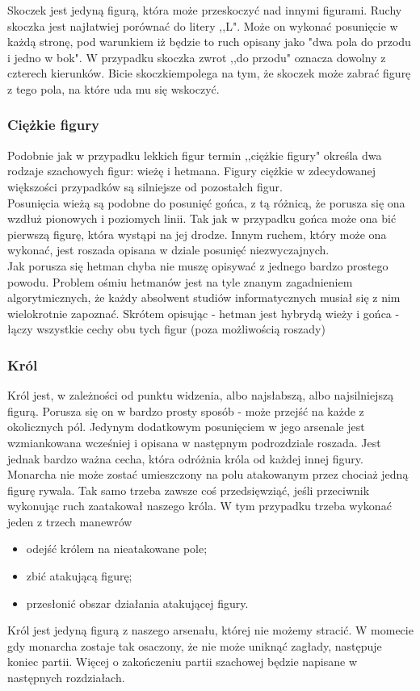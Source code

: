 \documentclass[12pt,leqno]{article}
\begin{document}
Skoczek jest jedyną figurą, która może przeskoczyć nad innymi figurami. Ruchy skoczka jest najłatwiej porównać do litery ,,L". Może on wykonać posunięcie w każdą stronę, pod warunkiem iż będzie to ruch opisany jako "dwa pola do przodu i jedno w bok". W przypadku skoczka zwrot ,,do przodu" oznacza dowolny z czterech kierunków. Bicie skoczkiempolega na tym, że skoczek może zabrać figurę z tego pola, na które uda mu się wskoczyć.
\subsubsection{Ciężkie figury}
Podobnie jak w przypadku lekkich figur termin ,,ciężkie figury" określa dwa rodzaje szachowych figur:  wieżę i hetmana. Figury ciężkie w zdecydowanej większości przypadków są silniejsze od pozostałch figur. \\
Posunięcia wieżą są podobne do posunięć gońca, z tą różnicą, że porusza się ona wzdłuż pionowych i poziomych linii. Tak jak w przypadku gońca może ona bić pierwszą figurę, która wystąpi na jej drodze. Innym ruchem, który może ona wykonać, jest roszada opisana w dziale posunięć niezwyczajnych.\\
Jak porusza się hetman chyba nie muszę opisywać z jednego bardzo prostego powodu. Problem ośmiu hetmanów jest na tyle znanym zagadnieniem algorytmicznych, że każdy absolwent studiów informatycznych musiał się z nim wielokrotnie zapoznać. Skrótem opisując - hetman jest hybrydą wieży i gońca - łączy wszystkie cechy obu tych figur (poza możliwością roszady)

\subsubsection{Król}
Król jest, w zależności od punktu widzenia, albo najsłabszą, albo najsilniejszą figurą. Porusza się on w bardzo prosty sposób - może przejść na każde z okolicznych pól. Jedynym dodatkowym posunięciem w jego arsenale jest wzmiankowana wcześniej i opisana w następnym podrozdziale roszada. Jest jednak bardzo ważna cecha, która odróżnia króla od każdej innej figury. Monarcha nie może zostać umieszczony na polu atakowanym przez chociaż jedną figurę rywala. Tak samo trzeba zawsze coś przedsięwziąć, jeśli przeciwnik wykonując ruch zaatakował naszego króla. W tym przypadku trzeba wykonać jeden z trzech manewrów
\begin{itemize}
\item odejść królem na nieatakowane pole;
\item zbić atakującą figurę;
\item przesłonić obszar działania atakującej figury.
\end{itemize}
Król jest jedyną figurą z naszego arsenału, której nie możemy stracić. W momecie gdy monarcha zostaje tak osaczony, że nie może uniknąć zagłady, następuje koniec partii. Więcej o zakończeniu partii szachowej będzie napisane w następnych rozdziałach.
\end{document}
